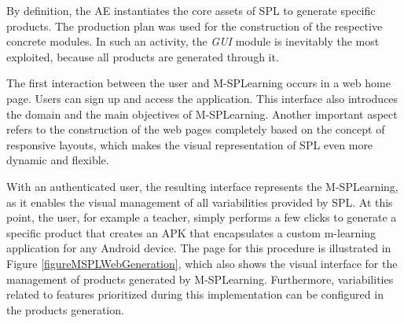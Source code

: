 By definition, the AE instantiates the core assets of SPL to generate specific products. The production plan was used for the construction of the respective concrete modules. In such an activity, the \textit{GUI} module is inevitably the most exploited, because all products are generated through it.

The first interaction between the user and M-SPLearning occurs in a web home page. Users can sign up and access the application. This interface also introduces the domain and the main objectives of M-SPLearning. Another important aspect refers to the construction of the web pages completely based on the concept of responsive layouts, which makes the visual representation of SPL even more dynamic and flexible. 

%

With an authenticated user, the resulting interface represents the M-SPLearning, as it enables the visual management of all variabilities provided by SPL. At this point, the user, for example a teacher, simply performs a few clicks to generate a specific product that creates an APK that encapsulates a custom m-learning application for any Android device. The page for this procedure is illustrated in Figure \ref{figureMSPLWebGeneration}, which also shows the visual interface for the management of products generated by M-SPLearning. Furthermore, variabilities related to features prioritized during this implementation can be configured in the products generation.

